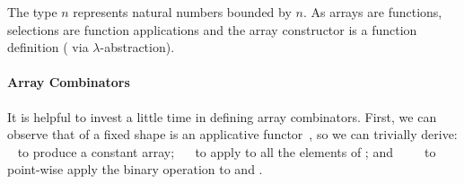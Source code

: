 The type  $n$ represents natural numbers bounded by $n$.
As arrays are functions, selections are function applications and
the array constructor is a function definition (\eg{} via $\lambda$-abstraction).

\paragraph{Array Combinators} It is helpful to invest a little time
in defining array combinators.  First, we can observe that  of
a fixed shape is an applicative functor~\cite{applicative}, so we can trivially derive:
\  to produce a constant array; \ \ 
to apply  to all the elements of ; and \ 
\ \  to point-wise apply the binary operation 
 to  and .
